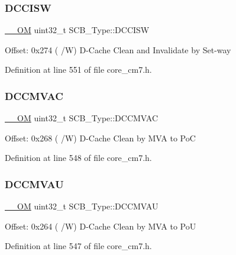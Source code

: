 \subsubsection{\texorpdfstring{D\+C\+C\+I\+SW}{DCCISW}}
{\footnotesize\ttfamily \hyperlink{core__sc300_8h_a0ea2009ed8fd9ef35b48708280fdb758}{\+\_\+\+\_\+\+OM} uint32\+\_\+t S\+C\+B\+\_\+\+Type\+::\+D\+C\+C\+I\+SW}

Offset\+: 0x274 ( /W) D-\/\+Cache Clean and Invalidate by Set-\/way 

Definition at line 551 of file core\+\_\+cm7.\+h.

\mbox{\label{struct_s_c_b___type_a042e3622c98de4e908cfda4f70d1f097}} 
\subsubsection{\texorpdfstring{D\+C\+C\+M\+V\+AC}{DCCMVAC}}
{\footnotesize\ttfamily \hyperlink{core__sc300_8h_a0ea2009ed8fd9ef35b48708280fdb758}{\+\_\+\+\_\+\+OM} uint32\+\_\+t S\+C\+B\+\_\+\+Type\+::\+D\+C\+C\+M\+V\+AC}

Offset\+: 0x268 ( /W) D-\/\+Cache Clean by M\+VA to PoC 

Definition at line 548 of file core\+\_\+cm7.\+h.

\mbox{\label{struct_s_c_b___type_aae3caeea159ab54859ea11397f942cfa}} 
\subsubsection{\texorpdfstring{D\+C\+C\+M\+V\+AU}{DCCMVAU}}
{\footnotesize\ttfamily \hyperlink{core__sc300_8h_a0ea2009ed8fd9ef35b48708280fdb758}{\+\_\+\+\_\+\+OM} uint32\+\_\+t S\+C\+B\+\_\+\+Type\+::\+D\+C\+C\+M\+V\+AU}

Offset\+: 0x264 ( /W) D-\/\+Cache Clean by M\+VA to PoU 

Definition at line 547 of file core\+\_\+cm7.\+h.

\mbox{\label{struct_s_c_b___type_ab95cc818be9fa7d25ae516f3fe6b7788}} 
